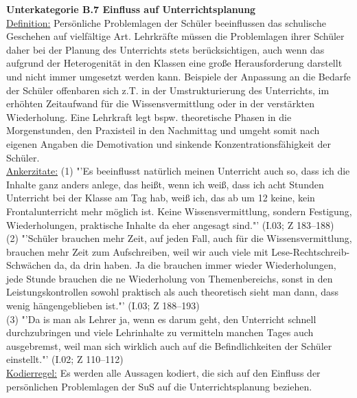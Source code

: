 \noindent
\textbf{Unterkategorie B.7 Einfluss auf Unterrichtsplanung}\\
\underline{Definition:} Persönliche Problemlagen der Schüler beeinflussen das schulische Geschehen auf vielfältige Art. Lehrkräfte müssen die Problemlagen ihrer Schüler daher bei der Planung des Unterrichts stets berücksichtigen, auch wenn das aufgrund der Heterogenität in den Klassen eine große Herausforderung darstellt und nicht immer umgesetzt werden kann. Beispiele der Anpassung an die Bedarfe der Schüler offenbaren sich z.T. in der Umstrukturierung des Unterrichts, im erhöhten Zeitaufwand für die Wissensvermittlung oder in der verstärkten Wiederholung. Eine Lehrkraft legt bspw. theoretische Phasen in die Morgenstunden, den Praxisteil in den Nachmittag und umgeht somit nach eigenen Angaben die Demotivation und sinkende Konzentrationsfähigkeit der Schüler.\\
\underline{Ankerzitate:} (1) "'Es beeinflusst natürlich meinen Unterricht auch so, dass ich die Inhalte ganz anders anlege, das heißt, wenn ich weiß, dass ich acht Stunden Unterricht bei der Klasse am Tag hab, weiß ich, das ab um 12 keine, kein Frontalunterricht mehr möglich ist. Keine Wissensvermittlung, sondern Festigung, Wiederholungen, praktische Inhalte da eher angesagt sind."' (I.03; Z 183--188)\\ (2) "'Schüler brauchen mehr Zeit, auf jeden Fall, auch für die Wissensvermittlung, brauchen mehr Zeit zum Aufschreiben, weil wir auch viele mit Lese-Rechtschreib-Schwächen da, da drin haben. Ja die brauchen immer wieder Wiederholungen, jede Stunde brauchen die ne Wiederholung von Themenbereichs, sonst in den Leistungskontrollen sowohl praktisch als auch theoretisch sieht man dann, dass wenig hängengeblieben ist."' (I.03; Z 188--193)\\ (3) "'Da is man als Lehrer ja, wenn es darum geht, den Unterricht schnell durchzubringen und viele Lehrinhalte zu vermitteln manchen Tages auch ausgebremst, weil man sich wirklich auch auf die Befindlichkeiten der Schüler einstellt."' (I.02; Z 110--112)\\
\underline{Kodierregel:} Es werden alle Aussagen kodiert, die sich auf den Einfluss der persönlichen Problemlagen der SuS auf die Unterrichtsplanung beziehen.\\

